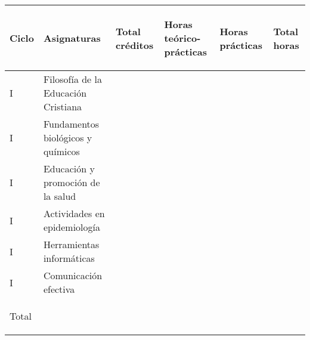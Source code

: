 \documentclass[9pt,a4paper]{article}
\begin{document}
  \begin{table}[ht]
    \centering
      \begin{tabular}{|m{0.7cm}|m{7cm}|m{1.4cm}|m{1.4cm}|m{1.4cm}|m{1.4cm}|}
        \hline
		\rowcolor{azul} \textcolor{blanco}{Ciclo} & 
		\textcolor{blanco}{\parbox{7cm}{\centering Asignaturas}} & 
		\textcolor{blanco}{\parbox{1.3cm}{\centering Total créditos}} & 
		\textcolor{blanco}{\parbox{1.3cm}{\centering Horas teórico-prácticas}} & 
		\textcolor{blanco}{\parbox{1.3cm}{\centering Horas prácticas}} &
		\textcolor{blanco}{\parbox{1.3cm}{\centering Total horas}} \\ 
		\hline

		{\parbox{0.7cm}{\centering I}}        & 
		Filosofía de la Educación Cristiana   & 
		{\parbox{1.4cm}{}}        & 
		{\parbox{1.4cm}{ }}     & 
		{\parbox{1.4cm}{}}        & 
		{\parbox{1.4cm}{}}       \\
		\hline
		{\parbox{0.7cm}{\centering I}}        & 
		Fundamentos biológicos y químicos     & 
		{\parbox{1.4cm}{ }}       & 
		{\parbox{1.4cm}{ }}      & 
		{\parbox{1.4cm}{ }}      & 
		{\parbox{1.4cm}{ }}      \\
		\hline
		{\parbox{0.7cm}{\centering I}}        & 
		Educación y promoción de la salud     & 
		{\parbox{1.4cm}{ }}       & 
		{\parbox{1.4cm}{ }}      & 
		{\parbox{1.4cm}{ }}      & 
		{\parbox{1.4cm}{ }}      \\
		\hline
		{\parbox{0.7cm}{\centering I}}        & 
		Actividades en epidemiología          & 
		{\parbox{1.4cm}{ }}       & 
		{\parbox{1.4cm}{ }}      & 
		{\parbox{1.4cm}{ }}      & 
		{\parbox{1.4cm}{ }}      \\
		\hline
		{\parbox{0.7cm}{\centering I}}        & 
		Herramientas informáticas             & 
		{\parbox{1.4cm}{ }}       & 
		{\parbox{1.4cm}{ }}      & 
		{\parbox{1.4cm}{ }}      & 
		{\parbox{1.4cm}{ }}      \\
		\hline
		{\parbox{0.7cm}{\centering I}}        & 
		Comunicación efectiva                 & 
		{\parbox{1.4cm}{ }}       & 
		{\parbox{1.4cm}{ }}      & 
		{\parbox{1.4cm}{  }}      & 
		{\parbox{1.4cm}{ }}      \\
		\hline
		\rowcolor{azul}
		\textcolor{blanco}{\parbox{0.7cm}{\centering Total}}    & 
		                                      & 
		\textcolor{blanco}{\parbox{1.4cm}{ }}      & 
		\textcolor{blanco}{\parbox{1.4cm}{ }}     & 
		\textcolor{blanco}{\parbox{1.4cm}{  }}    & 
		\textcolor{blanco}{\parbox{1.4cm}{ }}     \\
		\hline
		

\end{tabular}
\end{table}
\end{document}
